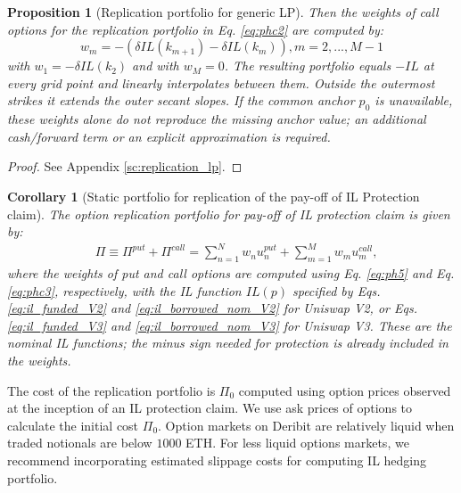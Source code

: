 \documentclass[pdftex,11pt,a4paper] {article}
\newtheorem{corollary}{Corollary}[section]
\newtheorem{proposition}{Proposition}[section]
\begin{document}
\begin{proposition}[Replication portfolio for generic LP]
Then the weights of call options for the replication portfolio in Eq. \eqref{eq:phc2} are computed by:
\begin{equation}  \label{eq:phc3}
w_{m} = -\left(\delta IL(k_{m+1})- \delta IL(k_{m})\right), m=2, ...,M-1
\end{equation}
with $w_{1} = -\delta IL(k_{2})$ and with $w_{M}=0$. The resulting portfolio equals $-IL$ at every grid point and linearly interpolates between them. Outside the outermost strikes it extends the outer secant slopes. If the common anchor $p_{0}$ is unavailable, these weights alone do not reproduce the missing anchor value; an additional cash/forward term or an explicit approximation is required.
\end{proposition}

\begin{proof}
See Appendix \ref{sc:replication_lp}.
\end{proof}

\begin{corollary}[Static portfolio for replication of the pay-off of IL
Protection claim]
The option replication portfolio for pay-off of IL protection claim is given
by:
\begin{equation}  \label{eq:il_static_rep}
\begin{split}
& \Pi \equiv \Pi^{put} +\Pi^{call} = \sum^{N}_{n=1}w_{n}u^{put}_{n} +
\sum^{M}_{m=1}w_{m}u^{call}_{m},
\end{split}%
\end{equation}
where the weights of put and call options are computed using Eq. %
\eqref{eq:ph5} and Eq. \eqref{eq:phc3}, respectively, with the IL function $IL(p)$
specified by Eqs. \eqref{eq:il_funded_V2} and \eqref{eq:il_borrowed_nom_V2} for Uniswap V2, or Eqs. \eqref{eq:il_funded_V3} and \eqref{eq:il_borrowed_nom_V3} for Uniswap V3. These are the nominal IL functions; the minus sign needed for protection is already included in the weights.


\end{corollary}

The cost of the replication portfolio is $\Pi_{0}$ computed using option
prices observed at the inception of an IL protection claim. We use ask prices of options to calculate the initial cost $\Pi_{0}$. Option markets on Deribit are relatively liquid when traded notionals are below $1000$ ETH. For less liquid options markets, we recommend incorporating estimated slippage costs for computing IL hedging portfolio.
\end{document}
